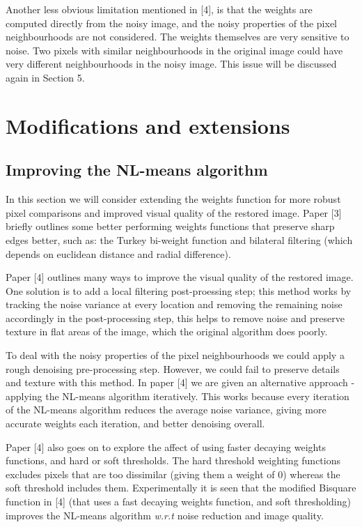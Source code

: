 \documentclass[11pt, twocolumn]{article}
\begin{document}
Another less obvious limitation mentioned in [4], is that the weights are computed directly from the noisy image, and the noisy properties of the pixel neighbourhoods are not considered. The weights themselves are very sensitive to noise. Two pixels with similar neighbourhoods in the original image could have very different neighbourhoods in the noisy image. This issue will be discussed again in Section 5.
\section{Modifications and extensions}
\subsection{Improving the NL-means algorithm}
In this section we will consider extending the weights function for more robust pixel comparisons and improved visual quality of the restored image. Paper [3] briefly outlines some better performing weights functions that preserve sharp edges better, such as: the Turkey bi-weight function and bilateral filtering (which depends on euclidean distance and radial difference). 

Paper [4] outlines many ways to improve the visual quality of the restored image. One solution is to add a local filtering post-proessing step; this method works by tracking the noise variance at every location and removing the remaining noise accordingly in the post-processing step, this helps to remove noise and preserve texture in flat areas of the image, which the original algorithm does poorly. 

To deal with the noisy properties of the pixel neighbourhoods we could apply a rough denoising pre-processing step. However, we could fail to preserve details and texture with this method. In paper [4] we are given an alternative approach - applying the NL-means algorithm iteratively. This works because every iteration of the NL-means algorithm reduces the average noise variance, giving more accurate weights each iteration, and better denoising overall. 

Paper [4] also goes on to explore the affect of using faster decaying weights functions, and hard or soft thresholds. The hard threshold weighting functions excludes pixels that are too dissimilar (giving them a weight of 0) whereas the soft threshold includes them. Experimentally it is seen that the modified Bisquare function in [4] (that uses a fast decaying weights function, and soft thresholding) improves the NL-means algorithm \textit{w.r.t} noise reduction and image quality.
\end{document}
